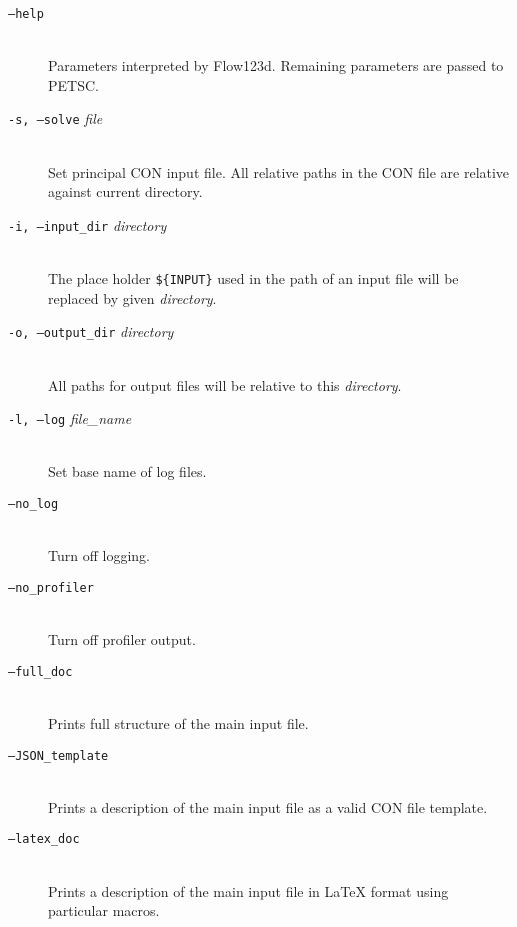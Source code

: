 \documentclass[12pt,a4paper]{report}
\begin{document}


\begin{description}
 \item[{\tt --help}] \hfill\\
        Parameters interpreted by Flow123d. Remaining parameters are passed to PETSC.
 \item[{\tt -s, --solve} {\it file}] \hfill\\
 	 Set principal CON input file. All relative paths in the CON file are relative against current directory.
 \item[{\tt -i, --input\_dir} {\it directory}] \hfill\\
 	The place holder \verb"${INPUT}" %
  	used in the path of an input file will be replaced by given {\it directory}.
 \item[{\tt -o, --output\_dir} {\it directory}] \hfill\\
 	All paths for output files will be relative to this {\it directory}. 
 \item[{\tt -l, --log} {\it file\_name}] \hfill\\
 	Set base name of log files.
 \item[{\tt --no\_log}] \hfill\\
        Turn off logging.
 \item[{\tt --no\_profiler}] \hfill\\
        Turn off profiler output.
 \item[{\tt --full\_doc}] \hfill\\
        Prints full structure of the main input file.
 \item[{\tt --JSON\_template}] \hfill\\
        Prints a description of the main input file as a valid CON file template.
 \item[{\tt --latex\_doc}] \hfill\\ 
        Prints a description of the main input file in LaTeX format using particular macros.
\end{description}
\end{document}

